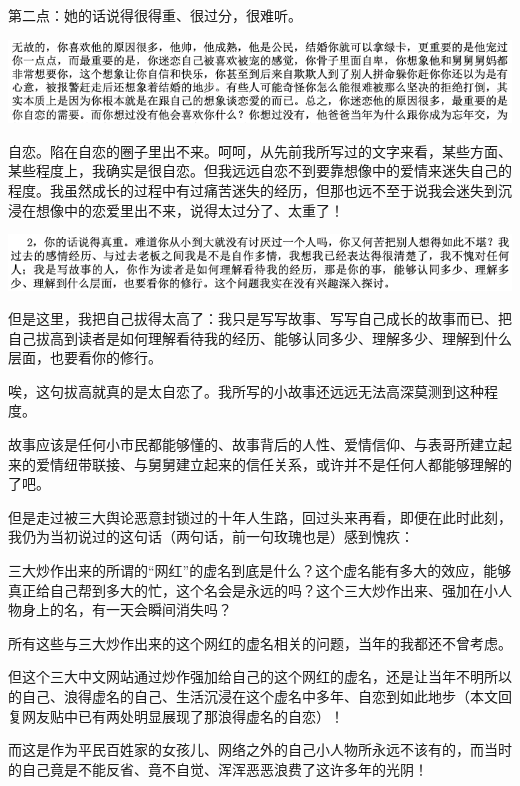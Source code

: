 \documentclass[9pt, b5paper]{article}
\begin{document}
第二点：她的话说得很得重、很过分，很难听。

\begin{center}
\includegraphics[width=.9\linewidth]{./pic/p1p109-3.png}
\end{center}

自恋。陷在自恋的圈子里出不来。呵呵，从先前我所写过的文字来看，某些方面、某些程度上，我确实是很自恋。但我远远自恋不到要靠想像中的爱情来迷失自己的程度。我虽然成长的过程中有过痛苦迷失的经历，但那也远不至于说我会迷失到沉浸在想像中的恋爱里出不来，说得太过分了、太重了！

\begin{center}
\includegraphics[width=.9\linewidth]{./pic/p1p114-3.png}
\end{center}

但是这里，我把自己拔得太高了：我只是写写故事、写写自己成长的故事而已、把自己拔高到读者是如何理解看待我的经历、能够认同多少、理解多少、理解到什么层面，也要看你的修行。

唉，这句拔高就真的是太自恋了。我所写的小故事还远远无法高深莫测到这种程度。

故事应该是任何小市民都能够懂的、故事背后的人性、爱情信仰、与表哥所建立起来的爱情纽带联接、与舅舅建立起来的信任关系，或许并不是任何人都能够理解的了吧。 

但是走过被三大舆论恶意封锁过的十年人生路，回过头来再看，即便在此时此刻，我仍为当初说过的这句话（两句话，前一句玫瑰也是）感到愧疚：

三大炒作出来的所谓的“网红”的虚名到底是什么？这个虚名能有多大的效应，能够真正给自己帮到多大的忙，这个名会是永远的吗？这个三大炒作出来、强加在小人物身上的名，有一天会瞬间消失吗？

所有这些与三大炒作出来的这个网红的虚名相关的问题，当年的我都还不曾考虑。

但这个三大中文网站通过炒作强加给自己的这个网红的虚名，还是让当年不明所以的自己、浪得虚名的自己、生活沉浸在这个虚名中多年、自恋到如此地步（本文回复网友贴中已有两处明显展现了那浪得虚名的自恋）！

而这是作为平民百姓家的女孩儿、网络之外的自己小人物所永远不该有的，而当时的自己竟是不能反省、竟不自觉、浑浑恶恶浪费了这许多年的光阴！
\end{document}
